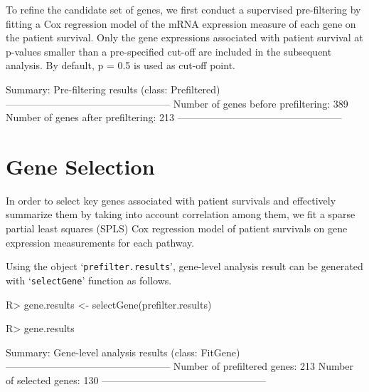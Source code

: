 \documentclass[11pt]{article}
\begin{document}
To refine the candidate set of genes, we first conduct a supervised pre-filtering by fitting a Cox regression model of the mRNA expression measure of each gene on the patient survival. Only the gene expressions associated with patient survival at p-values smaller than a pre-specified cut-off are included in the subsequent analysis. By default, p = 0.5 is used as cut-off point.

\begin{Schunk}
\begin{Soutput}
Summary: Pre-filtering results (class: Prefiltered)
--------------------------------------------------
Number of genes before prefiltering: 389
Number of genes after prefiltering: 213
--------------------------------------------------
\end{Soutput}
\end{Schunk}


\section{Gene Selection}

In order to select key genes associated with patient survivals and effectively summarize them by taking into account correlation among them, we fit a sparse partial least squares (SPLS) Cox regression model \cite{SPLS} of patient survivals on gene expression measurements for each pathway.

Using the object `\texttt{prefilter.results}', gene-level analysis result can be generated with `\texttt{selectGene}' function as follows.

\begin{Schunk}
\begin{Sinput}
R> gene.results <- selectGene(prefilter.results)
\end{Sinput}
\end{Schunk}
\begin{Schunk}
\begin{Sinput}
R> gene.results
\end{Sinput}
\begin{Soutput}
Summary: Gene-level analysis results (class: FitGene)
--------------------------------------------------
Number of prefiltered genes: 213
Number of selected genes: 130
--------------------------------------------------
\end{Soutput}
\end{Schunk}
\end{document}
